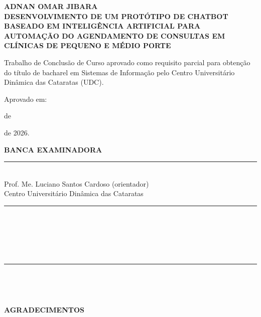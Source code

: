 \documentclass[12pt,a4paper]{extarticle}
\newif\ifrascunho
\newcommand{\dado}[1]{\ifrascunho\textcolor{red}{[#1]}\else\PackageError{tcc}{Dado pendente nao resolvido: \detokenize{#1}}{Resolva todos os campos marcados como dado antes da versao final.}\fi}
\begin{document}
\newpage
\thispagestyle{empty}
\begin{center}
    \textbf{ADNAN OMAR JIBARA}\\[1.2em]
    \textbf{DESENVOLVIMENTO DE UM PROTÓTIPO DE CHATBOT BASEADO EM INTELIGÊNCIA ARTIFICIAL PARA AUTOMAÇÃO DO AGENDAMENTO DE CONSULTAS EM CLÍNICAS DE PEQUENO E MÉDIO PORTE}
\end{center}
\vspace{1.5em}
\begin{flushright}
\begin{minipage}{8cm}
    Trabalho de Conclusão de Curso aprovado como requisito parcial para obtenção do título de bacharel em Sistemas de Informação pelo Centro Universitário Dinâmica das Cataratas (UDC).
\end{minipage}
\end{flushright}
\vspace{1.5em}
\noindent Aprovado em: \dado{dia} de \dado{mês} de 2026.

\vspace{1.5em}
\begin{center}
    \textbf{BANCA EXAMINADORA}\\[2.5em]
    \rule{9cm}{0.4pt}\\ Prof. Me. Luciano Santos Cardoso (orientador)\\ Centro Universitário Dinâmica das Cataratas\\[2.5em]
    \rule{9cm}{0.4pt}\\ \dado{Prof. membro da banca}\\ \dado{instituição}\\[2.5em]
    \rule{9cm}{0.4pt}\\ \dado{Prof. membro da banca}\\ \dado{instituição}
\end{center}

\newpage
\thispagestyle{empty}
\begin{center}
    {\Large\textbf{AGRADECIMENTOS}}
\end{center}
\vspace{1cm}
\end{document}
